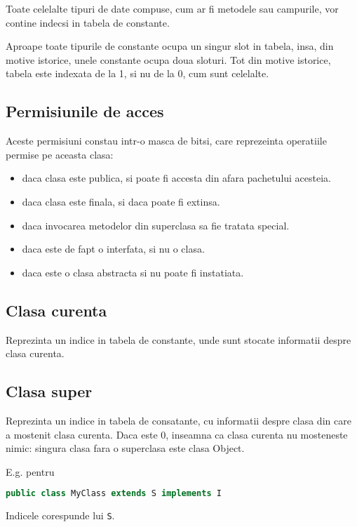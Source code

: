 Toate celelalte tipuri de date compuse, cum ar fi metodele sau
campurile, vor contine indecsi in tabela de constante.

Aproape toate tipurile de constante ocupa un singur slot in tabela, insa, din
motive istorice, unele constante ocupa doua sloturi.
Tot din motive istorice, tabela este indexata de la 1, si nu
de la 0, cum sunt celelalte.

\subsection{Permisiunile de acces}

Aceste permisiuni constau intr-o masca de bitsi, care reprezeinta
operatiile permise pe aceasta clasa:

\begin{itemize}
	\item daca clasa este publica, si poate fi accesta din afara pachetului acesteia.
	\item daca clasa este finala, si daca poate fi extinsa.
	\item daca invocarea metodelor din superclasa sa fie tratata special.
	\item daca este de fapt o interfata, si nu o clasa.
	\item daca este o clasa abstracta si nu poate fi instatiata.
\end{itemize}

\subsection{Clasa curenta}

Reprezinta un indice in tabela de constante, unde sunt stocate
informatii despre clasa curenta.

\subsection{Clasa super}

Reprezinta un indice in tabela de consatante, cu informatii despre clasa
din care a mostenit clasa curenta. Daca este 0, inseamna ca clasa
curenta nu mosteneste nimic: singura clasa fara o superclasa este clasa
Object.

E.g. pentru

\begin{lstlisting}[language=Java]
public class MyClass extends S implements I
\end{lstlisting}

Indicele corespunde lui \texttt{S}.

